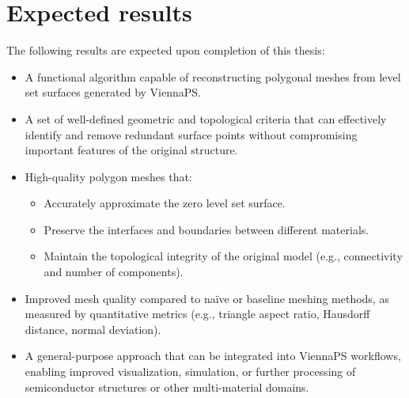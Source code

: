 \documentclass[submission]{eptcs}
\begin{document}
\section{Expected results}

The following results are expected upon completion of this thesis:

\begin{itemize}
    \item A functional algorithm capable of reconstructing polygonal meshes from level set surfaces generated by ViennaPS.
    
    \item A set of well-defined geometric and topological criteria that can effectively identify and remove redundant surface points without compromising important features of the original structure.

    \item High-quality polygon meshes that:
    \begin{itemize}
        \item Accurately approximate the zero level set surface.
        \item Preserve the interfaces and boundaries between different materials.
        \item Maintain the topological integrity of the original model (e.g., connectivity and number of components).
    \end{itemize}
    
    \item Improved mesh quality compared to naïve or baseline meshing methods, as measured by quantitative metrics (e.g., triangle aspect ratio, Hausdorff distance, normal deviation).

    \item A general-purpose approach that can be integrated into ViennaPS workflows, enabling improved visualization, simulation, or further processing of semiconductor structures or other multi-material domains.
\end{itemize}


\nocite{*}


\end{document}
